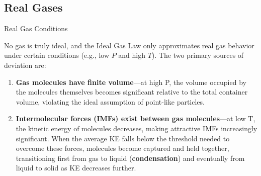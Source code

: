 \documentclass[10pt]{article}
\begin{document}
  \subsection{Real Gases}

    \begin{core}{Real Gas Conditions}

      No gas is truly ideal, and the Ideal Gas Law only approximates real gas behavior under certain conditions (e.g., low $P$ and high $T$). The two primary sources of deviation are:

      \begin{enumerate}

        \item \textbf{Gas molecules have finite volume}---at high P, the volume occupied by the molecules themselves becomes significant relative to the total container volume, violating the ideal assumption of point-like particles.

        \item \textbf{Intermolecular forces (IMFs) exist between gas molecules}---at low T, the kinetic energy of molecules decreases, making attractive IMFs increasingly significant. When the average KE falls below the threshold needed to overcome these forces, molecules become captured and held together, transitioning first from gas to liquid (\textbf{condensation}) and eventually from liquid to solid as KE decreases further.
          
      \end{enumerate}

\end{core}
\end{document}

